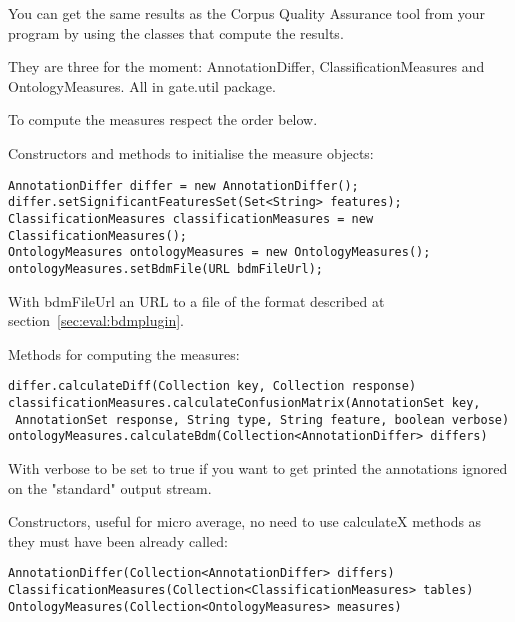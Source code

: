 You can get the same results as the Corpus Quality Assurance tool from your
program by using the classes that compute the results.

They are three for the moment:
{AnnotationDiffer},
{ClassificationMeasures} and
{OntologyMeasures}. All in gate.util package.

To compute the measures respect the order below.

Constructors and methods to initialise the measure objects:
\begin{small}
\begin{verbatim}
AnnotationDiffer differ = new AnnotationDiffer();
differ.setSignificantFeaturesSet(Set<String> features);
ClassificationMeasures classificationMeasures = new ClassificationMeasures();
OntologyMeasures ontologyMeasures = new OntologyMeasures();
ontologyMeasures.setBdmFile(URL bdmFileUrl);
\end{verbatim}\end{small}

With bdmFileUrl an URL to a file of the format described at
section~\ref{sec:eval:bdmplugin}.

Methods for computing the measures:
\begin{small}\begin{verbatim}
differ.calculateDiff(Collection key, Collection response)
classificationMeasures.calculateConfusionMatrix(AnnotationSet key,
 AnnotationSet response, String type, String feature, boolean verbose)
ontologyMeasures.calculateBdm(Collection<AnnotationDiffer> differs)
\end{verbatim}\end{small}

With verbose to be set to true if you want to get printed the annotations
ignored on the "standard" output stream.

Constructors, useful for micro average, no need to use calculateX methods
as they must have been already called:
\begin{small}
\begin{verbatim}
AnnotationDiffer(Collection<AnnotationDiffer> differs)
ClassificationMeasures(Collection<ClassificationMeasures> tables)
OntologyMeasures(Collection<OntologyMeasures> measures)
\end{verbatim}\end{small}

